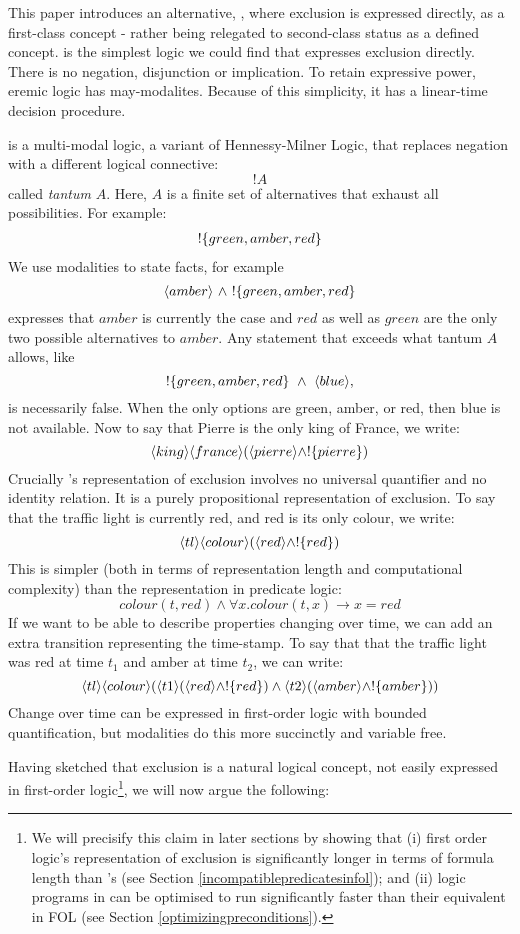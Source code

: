 This paper introduces an alternative, \ELFULL{}, where exclusion is
expressed directly, as a first-class concept - rather being relegated
to second-class status as a defined concept. \ELFULL{} is the simplest
logic we could find that expresses exclusion directly.  There is no
negation, disjunction or implication. To retain expressive power,
eremic logic has may-modalites.  Because of this simplicity, it has a
linear-time decision procedure.

\ELFULL{} is a multi-modal logic, a variant of Hennessy-Milner Logic,
that replaces negation with a different logical connective:
\[
   !A
\]
called \emph{tantum} $A$. Here, $A$ is a finite set of alternatives
that exhaust all possibilities.  For example:
\begin{eqnarray*}
! \{green, amber, red\}
\end{eqnarray*}
We use modalities to state  facts, for example
\[
   \langle amber \rangle\ \land\ !\{green, amber, red\} 
\]
expresses that $amber$ is currently the case and $red$ as well as
$green$ are the only two possible alternatives to $amber$.  Any
statement that exceeds what tantum $A$ allows, like
\[
   !\{green, amber, red\}\ \AND\ \MAY{blue},
\]
is necessarily false.  When the only options are green, amber, or red,
then blue is not available.  Now to say that Pierre is the only king
of France, we write:
\[
\langle king \rangle \langle france \rangle (\langle pierre \rangle \land ! \{pierre\})
\]
Crucially \ELFULL{}'s representation of exclusion involves no
universal quantifier and no identity relation.  It is a purely
propositional representation of exclusion.  To say that the traffic
light is currently red, and red is its only colour, we write:
\[
\langle tl \rangle \langle colour \rangle (\langle red \rangle \land !\{red\})
\]
This is simpler (both in terms of representation length and
computational complexity) than the representation in predicate logic:
\[
colour(t, red) \land \forall x . colour(t, x) \rightarrow x = red
\]
If we want to be able to describe properties changing over time, we
can add an extra transition representing the time-stamp.  To say that
that the traffic light was red at time $t_1$ and amber at time $t_2$,
we can write:
\[
   \langle tl \rangle \langle colour \rangle (\langle t1 \rangle (\langle red \rangle \land !\{red\}) \land \langle t2 \rangle (\langle amber \rangle \land !\{amber\}))
\]
Change over time can be expressed in first-order logic with bounded
quantification, but modalities do this more succinctly and variable
free.

Having sketched that exclusion is a natural logical concept, not
easily expressed in first-order logic\footnote{We will precisify this
  claim in later sections by showing that (i) first order logic's
  representation of exclusion is significantly longer in terms of
  formula length than \ELFULL{}'s (see Section
  \ref{incompatiblepredicatesinfol}); and (ii) logic programs in
  \ELFULL{} can be optimised to run significantly faster than their
  equivalent in FOL (see Section \ref{optimizingpreconditions}).},  we
will now argue the following:

